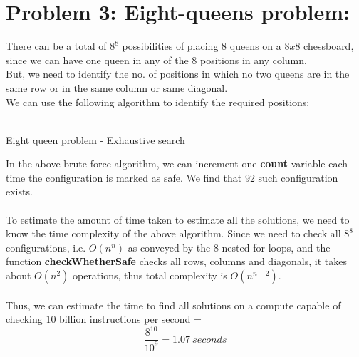 \documentclass[12pt]{report}
\begin{document}
\section{Problem 3: Eight-queens problem:}
There can be a total of $8^{8}$ possibilities of placing $8$ queens on a $8x8$ chessboard, since we can have one queen in any of the 8 positions in any column. 
\\
But, we need to identify the no. of positions in which no two queens are in the same row or in the same column or same diagonal. 
\\
We can use the following algorithm to identify the required positions: 
\\ \\
\begin{algorithm}[H]
	\SetAlgoLined
	\caption{Eight queen problem - Exhaustive search}	
\end{algorithm}
In the above brute force algorithm, we can increment one \textbf{count} variable each time the configuration is marked as safe. We find that 92 such configuration exists.
\\ \\
To estimate the amount of time taken to estimate all the solutions, we need to know the time complexity of the above algorithm. Since we need to check all $8^{8}$ configurations, i.e. $O(n^{n})$ as conveyed by the 8 nested for loops, and the function \textbf{checkWhetherSafe} checks all rows, columns and diagonals, it takes about $O(n^{2})$ operations, thus total complexity is $O(n^{n + 2})$. 
\\ \\
Thus, we can estimate the time to find all solutions on a compute capable of checking $10$ billion instructions per second = 
\[\frac{8^{10}}{10^{9}} = 1.07 \ seconds\]

\end{document}
